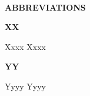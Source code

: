~\vspace{2\baselineskip}

\begin{center}
	\bf ABBREVIATIONS
\end{center}
\vspace{3\baselineskip}

\noindent \parbox{0.15\textwidth}{\bf XX}
\parbox{0.8\textwidth}{Xxxx Xxxx}

\noindent \parbox{0.15\textwidth}{\bf YY}
\parbox{0.8\textwidth}{Yyyy Yyyy}



\newpage
